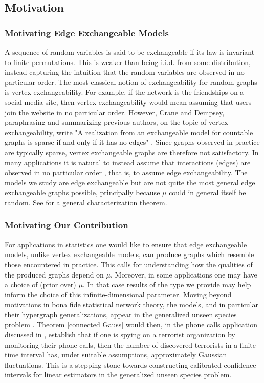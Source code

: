 \documentclass[12pt]{article}
\theoremstyle{definition}
\begin{document}
\subsection{Motivation} \label{Motivation}

\subsubsection{Motivating Edge Exchangeable Models}
A sequence of random variables is said to be exchangeable if its law is invariant to finite permutations. This is weaker than being i.i.d. from some distribution, instead capturing the intuition that the random variables are observed in no particular order. The most classical notion of exchangeability for random graphs is vertex exchangeability. For example, if the network is the friendships on a social media site, then vertex exchangeability would mean assuming that users join the website in no particular order. However, Crane and Dempsey, paraphrasing and summarizing previous authors, on the topic of vertex exchangeability, write "A realization from an exchangeable model for countable graphs is
sparse if and only if it has no edges" \cite{crane_2018_edge}. Since graphs observed in practice are typically sparse, vertex exchangeable graphs are therefore not satisfactory. In many applications it is natural to instead assume that interactions (edges) are observed in no particular order \cite{crane_2018_edge,cai_2016_edgeexchangeable}, that is, to assume edge exchangeability. The models we study are edge exchangeable but are not quite the most general edge exchangeable graphs possible, principally because $\mu$ could in general itself be random. See \cite{crane_2018_edge} for a general characterization theorem.

\subsubsection{Motivating Our Contribution}  For applications in statistics one would like to ensure that edge exchangeable models, unlike vertex exchangeable models, can produce graphs which resemble those encountered in practice. This calls for understanding how the qualities of the produced graphs depend on $\mu$. Moreover, in some applications one may have a choice of (prior over) $\mu$. In that case results of the type we provide may help inform the choice of this infinite-dimensional parameter. Moving beyond motivations in bona fide statistical network theory, the models, and in particular their hypergraph generalizations, appear in the generalized unseen species problem \cite{eriksson_2026_the}. Theorem \ref{connected Gauss} would then, in the phone calls application discussed in \cite{eriksson_2026_the}, establish that if one is spying on a terrorist organization by monitoring their phone calls, then the number of discovered terrorists in a finite time interval has, under suitable assumptions, approximately Gaussian fluctuations. This is a stepping stone towards constructing calibrated confidence intervals for linear estimators in the generalized unseen species problem.
\end{document}
